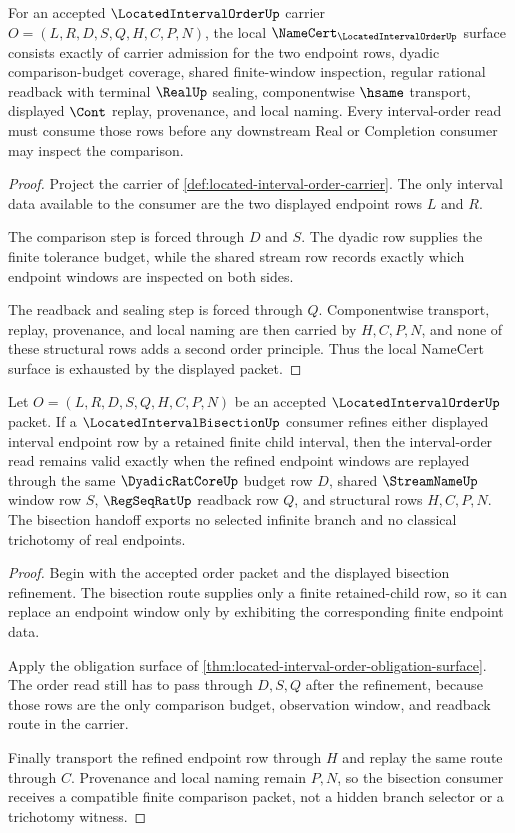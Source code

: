 \begin{theorem}
\label{thm:located-interval-order-obligation-surface}
For an accepted $\LocatedIntervalOrderUp$ carrier $O=(L,R,D,S,Q,H,C,P,N)$, the local $\NameCert_{\LocatedIntervalOrderUp}$ surface consists exactly of carrier admission for the two endpoint rows, dyadic comparison-budget coverage, shared finite-window inspection, regular rational readback with terminal $\RealUp$ sealing, componentwise $\hsame$ transport, displayed $\Cont$ replay, provenance, and local naming. Every interval-order read must consume those rows before any downstream Real or Completion consumer may inspect the comparison.
\end{theorem}
\begin{proof}
Project the carrier of \autoref{def:located-interval-order-carrier}. The only interval data available to the consumer are the two displayed endpoint rows $L$ and $R$.

The comparison step is forced through $D$ and $S$. The dyadic row supplies the finite tolerance budget, while the shared stream row records exactly which endpoint windows are inspected on both sides.

The readback and sealing step is forced through $Q$. Componentwise transport, replay, provenance, and local naming are then carried by $H,C,P,N$, and none of these structural rows adds a second order principle. Thus the local NameCert surface is exhausted by the displayed packet.
\end{proof}

\begin{theorem}
\label{thm:located-interval-order-bisection-compatibility}
Let $O=(L,R,D,S,Q,H,C,P,N)$ be an accepted $\LocatedIntervalOrderUp$ packet. If a $\LocatedIntervalBisectionUp$ consumer refines either displayed interval endpoint row by a retained finite child interval, then the interval-order read remains valid exactly when the refined endpoint windows are replayed through the same $\DyadicRatCoreUp$ budget row $D$, shared $\StreamNameUp$ window row $S$, $\RegSeqRatUp$ readback row $Q$, and structural rows $H,C,P,N$. The bisection handoff exports no selected infinite branch and no classical trichotomy of real endpoints.
\end{theorem}
\begin{proof}
Begin with the accepted order packet and the displayed bisection refinement. The bisection route supplies only a finite retained-child row, so it can replace an endpoint window only by exhibiting the corresponding finite endpoint data.

Apply the obligation surface of \autoref{thm:located-interval-order-obligation-surface}. The order read still has to pass through $D,S,Q$ after the refinement, because those rows are the only comparison budget, observation window, and readback route in the carrier.

Finally transport the refined endpoint row through $H$ and replay the same route through $C$. Provenance and local naming remain $P,N$, so the bisection consumer receives a compatible finite comparison packet, not a hidden branch selector or a trichotomy witness.
\end{proof}

